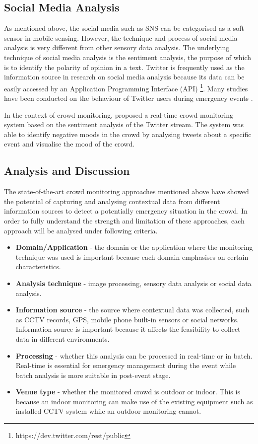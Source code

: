 \subsection{Social Media Analysis}
As mentioned above, the social media such as SNS can be categorised as a soft sensor in mobile sensing. However, the technique and process of social media analysis is very different from other sensory data analysis. The underlying technique of social media analysis is the sentiment analysis, the purpose of which is to identify the polarity of opinion in a text. Twitter is frequently used as the information source in research on social media analysis because its data can be easily accessed by an Application Programming Interface (API) \footnote{https://dev.twitter.com/rest/public}. Many studies have been conducted on the behaviour of Twitter users during emergency events \parencite{Hughes2009,Sakaki2010,Vieweg2010,Yin2012}.

In the context of crowd monitoring, \textcite{DelirHaghighi2013} proposed a real-time crowd monitoring system based on the sentiment analysis of the Twitter stream. The system was able to identify negative moods in the crowd by analysing tweets about a specific event and visualise the mood of the crowd.

\subsection{Analysis and Discussion}
The state-of-the-art crowd monitoring approaches mentioned above have showed the potential of capturing and analysing contextual data from different information sources to detect a potentially emergency situation in the crowd. In order to fully understand the strength and limitation of these approaches, each approach will be analysed under following criteria.

\begin{itemize}
	\item \textbf{Domain/Application} - the domain or the application where the monitoring technique was used is important because each domain emphasises on certain characteristics. 
	\item \textbf{Analysis technique} - image processing, sensory data analysis or social data analysis.
	\item \textbf{Information source} - the source where contextual data was collected, such as CCTV records, GPS, mobile phone built-in sensors or social networks. Information source is important because it affects the feasibility to collect data in different environments.
	\item \textbf{Processing} - whether this analysis can be processed in real-time or in batch. Real-time is essential for emergency management during the event while batch analysis is more suitable in post-event stage.
	\item \textbf{Venue type} - whether the monitored crowd is outdoor or indoor. This is because an indoor monitoring can make use of the existing equipment such as installed CCTV system while an outdoor monitoring cannot.
\end{itemize}

